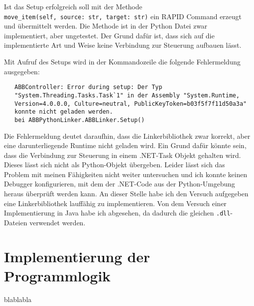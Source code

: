 Ist das Setup erfolgreich soll mit der Methode \\
\verb|move_item(self, source: str, target: str)| ein RAPID Command erzeugt und übermittelt werden.
Die Methode ist in der Python Datei zwar implementiert, aber ungetestet. 
Der Grund dafür ist, dass sich auf die implementierte Art und Weise keine Verbindung zur Steuerung aufbauen lässt.

Mit Aufruf des Setups wird in der Kommandozeile die folgende Fehlermeldung ausgegeben: 

\begin{verbatim}
   ABBController: Error during setup: Der Typ 
   "System.Threading.Tasks.Task`1" in der Assembly "System.Runtime, 
   Version=4.0.0.0, Culture=neutral, PublicKeyToken=b03f5f7f11d50a3a" 
   konnte nicht geladen werden.
   bei ABBPythonLinker.ABBLinker.Setup()
\end{verbatim}

Die Fehlermeldung deutet daraufhin, dass die Linkerbibliothek zwar korrekt, aber eine darunterliegende Runtime nicht geladen wird. 
Ein Grund dafür könnte sein, dass die Verbindung zur Steuerung in einem .NET-Task Objekt gehalten wird. Dieses lässt sich nicht als Python-Objekt übergeben.
Leider lässt sich das Problem mit meinen Fähigkeiten nicht weiter untersuchen und ich konnte keinen Debugger konfigurieren, mit dem der .NET-Code aus der Python-Umgebung heraus überprüft werden kann.
An dieser Stelle habe ich den Versuch aufgegeben eine Linkerbibliothek lauffähig zu implementieren.
Von dem Versuch einer Implementierung in Java habe ich abgesehen, da dadurch die gleichen \verb|.dll|-Dateien verwendet werden.

\section{Implementierung der Programmlogik}

blablabla